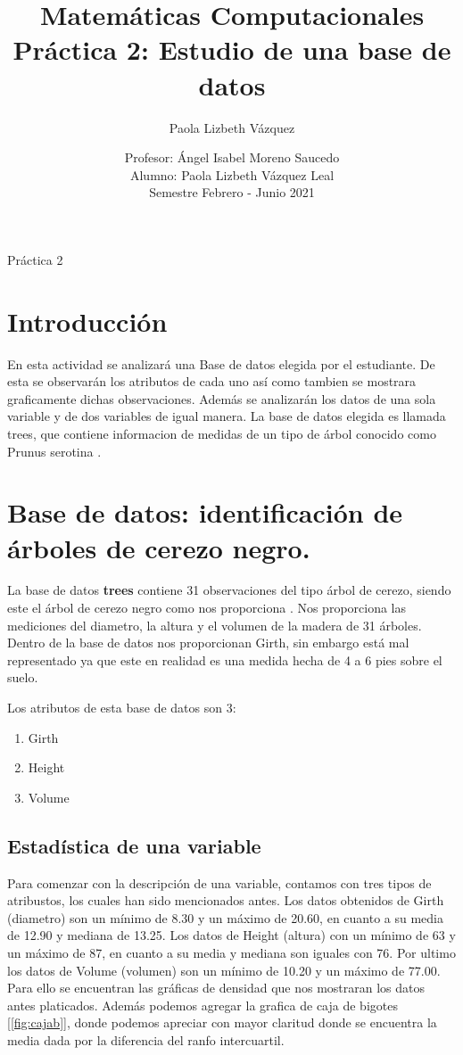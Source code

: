 \documentclass[12pt,a4paper]{article}
\author{Paola Lizbeth Vázquez}
\title{Matemáticas Computacionales \\ Práctica 2: Estudio de una base de datos}
\author{Profesor: Ángel Isabel Moreno Saucedo \\ Alumno: Paola Lizbeth Vázquez Leal \\ Semestre Febrero - Junio 2021}
\date{}
\begin{document}
\maketitle
Práctica 2
\section{Introducción}

 En esta actividad se analizará una Base de datos elegida por el estudiante. De esta se observarán los atributos de cada uno así como tambien se mostrara graficamente dichas observaciones. Además se analizarán los datos de una sola variable y de dos variables de igual manera. La base de datos elegida es llamada trees, que contiene informacion de medidas de un tipo de árbol conocido como Prunus serotina  \citep{plants}.


\section{Base de datos: identificación de árboles de cerezo negro.}

  La base de datos \textbf{trees} contiene 31 observaciones del tipo  árbol de cerezo, siendo este el árbol de cerezo negro como nos proporciona \citep{PTR}. Nos proporciona las mediciones del diametro, la altura y el volumen de la madera de 31 árboles. Dentro de la base de datos nos proporcionan Girth, sin embargo está mal representado ya que este en realidad es una medida hecha de 4 a 6 pies sobre el suelo. 

Los atributos de esta base de datos son 3:

\begin{enumerate}
\item Girth
\item Height
\item Volume
\end{enumerate}



\subsection{Estadística de una variable}
Para comenzar con la descripción de una variable, contamos con tres tipos de atribustos, los cuales han sido mencionados antes. Los datos obtenidos de Girth  (diametro) son un mínimo de 8.30 y un máximo de 20.60, en cuanto a su media de  12.90 y mediana de 13.25. Los datos de Height (altura) con un mínimo de 63 y un máximo de 87, en cuanto a su media y mediana son iguales con 76. Por ultimo los datos de Volume (volumen) son un mínimo de 10.20 y un máximo de 77.00. Para ello se encuentran las gráficas de densidad que nos mostraran los datos antes platicados.
Además podemos agregar la grafica de caja de bigotes [\ref{fig:cajab}], donde podemos apreciar con mayor claritud donde se encuentra la media dada por la diferencia del ranfo intercuartil.
\end{document}
